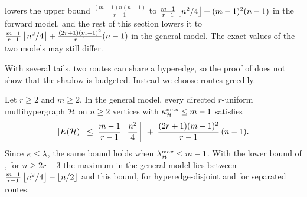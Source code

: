 lowers the upper bound $\frac{(m-1)n(n-1)}{r-1}$ to $\frac{m-1}{r-1}\left\lfloor n^2/4 \right\rfloor+(m-1)^2(n-1)$ in the forward model, and the rest of this section lowers it to $\frac{m-1}{r-1}\left\lfloor n^2/4 \right\rfloor+\frac{(2r+1)(m-1)^2}{r-1}(n-1)$ in the general model. The exact values of the two models may still differ.

With several tails, two routes can share a hyperedge, so the proof of  does not show that the shadow is budgeted. Instead we choose routes greedily.

\begin{theorem}\label{thm:dir-hyper-general-constant}
Let $r \ge 2$ and $m \ge 2$. In the general model, every directed $r$-uniform multihypergraph $\mathcal{H}$ on $n \ge 2$
vertices with $\kappa^{\max}_{\mathcal{H}} \le m-1$ satisfies
\[
    |E(\mathcal{H})| \;\le\; \frac{m-1}{r-1}\left\lfloor \frac{n^2}{4} \right\rfloor
    \;+\; \frac{(2r+1)(m-1)^2}{r-1}\,(n-1) .
\]
Since $\kappa\le\lambda$, the same bound holds when $\lambda^{\max}_{\mathcal{H}} \le m-1$. With the lower bound of , for $n\ge2r-3$ the maximum in the general model lies between $\frac{m-1}{r-1}\left\lfloor n^2/4 \right\rfloor-\left\lfloor n/2 \right\rfloor$ and this bound, for hyperedge-disjoint and for separated routes.
\end{theorem}

